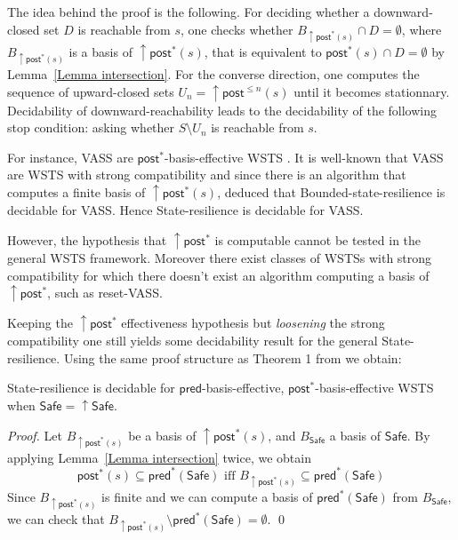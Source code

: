 \documentclass[runningheads]{llncs}
\newcommand{\alain}[1]{\todo[inline,color=red!20]{{\bf AF:} #1}}
\newcommand{\pred}{\textsf{pred}}
\newcommand{\post}{\textsf{post}}
\newcommand{\Safe}{\textsf{Safe}}
\begin{document}
The idea behind the proof is the following. For deciding whether a downward-closed set $D$ is reachable from $s$, one checks whether
$B_{\mathop{\uparrow} \post^*(s)} \cap D = \emptyset$, 
where $B_{\mathop{\uparrow} \post^*(s)}$ is a basis of $\mathop{\uparrow} \post^*(s)$,
 that is equivalent to $\post^*(s)\cap D = \emptyset$ by
Lemma~\ref{Lemma intersection}. For the converse direction, one computes the sequence of upward-closed sets
$U_n = \mathop{\uparrow} \post^{\leq n}(s)$ %
until it becomes stationnary. 
Decidability of downward-reachability leads to the decidability of the following stop condition:
asking whether $S \setminus U_n$ is reachable from $s$.




For instance,
VASS are $ \post^*$-basis-effective WSTS \cite{DBLP:journals/corr/abs-2108-00889}. 
It is well-known that 
VASS are WSTS with strong compatibility and since there is an algorithm that computes a finite basis of  $\mathop{\uparrow} \post^*(s)$, \cite{DBLP:conf/gg/Ozkan22} deduced that {\sc Bounded-state-resilience} is decidable for VASS.
Hence {\sc State-resilience} is decidable for  
VASS.

However, the hypothesis that $\mathop{\uparrow} \post^*$ is computable cannot be tested in the general WSTS framework.  
Moreover there exist classes of WSTSs with strong 
 compatibility for which there doesn't exist an algorithm computing a basis of $\mathop{\uparrow} \post^*$, such as reset-VASS.

Keeping the $\mathop{\uparrow} \post^*$ effectiveness hypothesis but \emph{loosening} the strong compatibility one still yields some decidability result for the general {\sc State-resilience}. Using the same proof structure as Theorem 1 from \cite{DBLP:journals/corr/abs-2108-00889} we obtain:


\begin{theorem}\label{post srp}
{\sc State-resilience} is decidable for $\pred$-basis-effective, $\post^*$-basis-effective WSTS
when
$\Safe=\mathop{\uparrow} \Safe$. 
\end{theorem}


\begin{proof}
Let $B_{\mathop{\uparrow} \post^*(s)}$ 
 be a basis of $\mathop{\uparrow} \post^*(s)$, and $B_\Safe$ a basis of $\Safe$.
By applying Lemma~\ref{Lemma intersection} twice, we obtain
\[ \post^*(s) 
 \subseteq \pred^*(\Safe) \text{ iff } B_{\mathop{\uparrow} \post^*(s)}  
 \subseteq \pred^*(\Safe)\]
Since $B_{\mathop{\uparrow} \post^*(s)}$ is finite and we can compute 
a basis of $\pred^*(\Safe)$ from $B_\Safe$, we can check that $B_{\mathop{\uparrow} \post^*(s)} 
 \setminus \pred^*(\Safe) = \emptyset$.  \qed
\end{proof}
\end{document}
